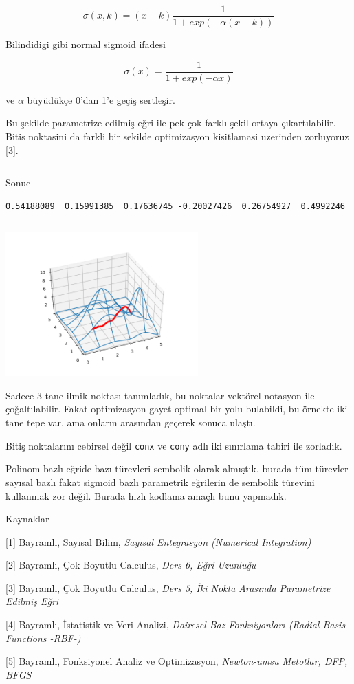 \documentclass[12pt,fleqn]{article}\usepackage{../../common}
\begin{document}
$$
\sigma (x,k) = (x-k) \frac{1}{1 + exp(-\alpha (x-k))}
$$

Bilindidigi gibi normal sigmoid ifadesi

$$
\sigma (x) = \frac{1}{1 + exp(-\alpha x)}
$$

ve $\alpha$ büyüdükçe 0'dan 1'e geçiş sertleşir. 

Bu şekilde parametrize edilmiş eğri ile pek çok farklı şekil ortaya
çıkartılabilir. Bitis noktasini da farkli bir sekilde optimizasyon
kisitlamasi uzerinden zorluyoruz [3]. 

\inputminted[fontsize=\footnotesize]{python}{paths3.py}

Sonuc

\begin{verbatim}
0.54188089  0.15991385  0.17636745 -0.20027426  0.26754927  0.4992246 
\end{verbatim}

\inputminted[fontsize=\footnotesize]{python}{paths3plot.py}

\includegraphics[width=20em]{calc_multi_40_elev_06.png}

Sadece 3 tane ilmik noktası tanımladık, bu noktalar vektörel notasyon ile
çoğaltılabilir. Fakat optimizasyon gayet optimal bir yolu bulabildi, bu
örnekte iki tane tepe var, ama onların arasından geçerek sonuca ulaştı. 

Bitiş noktalarını cebirsel değil \verb!conx! ve \verb!cony! adlı iki
sınırlama tabiri ile zorladık.

Polinom bazlı eğride bazı türevleri sembolik olarak almıştık, burada
tüm türevler sayısal bazlı fakat sigmoid bazlı parametrik eğrilerin de
sembolik türevini kullanmak zor değil. Burada hızlı kodlama amaçlı bunu
yapmadık. 

Kaynaklar 

[1] Bayramlı, Sayısal Bilim, {\em Sayısal Entegrasyon (Numerical Integration)}

[2] Bayramlı, Çok Boyutlu Calculus, {\em Ders 6, Eğri Uzunluğu}

[3] Bayramlı, Çok Boyutlu Calculus, {\em Ders 5, İki Nokta Arasında Parametrize Edilmiş Eğri}

[4] Bayramlı, İstatistik ve Veri Analizi, {\em Dairesel Baz Fonksiyonları (Radial Basis Functions -RBF-)}

[5] Bayramlı, Fonksiyonel Analiz ve Optimizasyon, {\em Newton-umsu Metotlar, DFP, BFGS }
\end{document}
